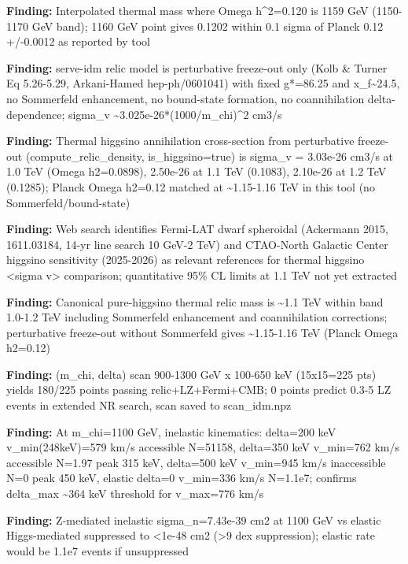 \documentclass[11pt,a4paper]{article}
\begin{document}
\textbf{Finding:} Interpolated thermal mass where Omega h\textasciicircum{}2=0.120 is 1159 GeV (1150-1170 GeV band); 1160 GeV point gives 0.1202 within 0.1 sigma of Planck 0.12 +/-0.0012 as reported by tool

\textbf{Finding:} serve-idm relic model is perturbative freeze-out only (Kolb \& Turner Eq 5.26-5.29, Arkani-Hamed hep-ph/0601041) with fixed g*=86.25 and x\_f\textasciitilde{}24.5, no Sommerfeld enhancement, no bound-state formation, no coannihilation delta-dependence; sigma\_v \textasciitilde{}3.025e-26*(1000/m\_chi)\textasciicircum{}2 cm3/s

\textbf{Finding:} Thermal higgsino annihilation cross-section from perturbative freeze-out (compute\_relic\_density, is\_higgsino=true) is sigma\_v = 3.03e-26 cm3/s at 1.0 TeV (Omega h2=0.0898), 2.50e-26 at 1.1 TeV (0.1083), 2.10e-26 at 1.2 TeV (0.1285); Planck Omega h2=0.12 matched at \textasciitilde{}1.15-1.16 TeV in this tool (no Sommerfeld/bound-state)

\textbf{Finding:} Web search identifies Fermi-LAT dwarf spheroidal (Ackermann 2015, 1611.03184, 14-yr line search 10 GeV-2 TeV) and CTAO-North Galactic Center higgsino sensitivity (2025-2026) as relevant references for thermal higgsino \textless{}sigma v\textgreater{} comparison; quantitative 95\% CL limits at 1.1 TeV not yet extracted

\textbf{Finding:} Canonical pure-higgsino thermal relic mass is \textasciitilde{}1.1 TeV within band 1.0-1.2 TeV including Sommerfeld enhancement and coannihilation corrections; perturbative freeze-out without Sommerfeld gives \textasciitilde{}1.15-1.16 TeV (Planck Omega h2=0.12)

\textbf{Finding:} (m\_chi, delta) scan 900-1300 GeV x 100-650 keV (15x15=225 pts) yields 180/225 points passing relic+LZ+Fermi+CMB; 0 points predict 0.3-5 LZ events in extended NR search, scan saved to scan\_idm.npz

\textbf{Finding:} At m\_chi=1100 GeV, inelastic kinematics: delta=200 keV v\_min(248keV)=579 km/s accessible N=51158, delta=350 keV v\_min=762 km/s accessible N=1.97 peak 315 keV, delta=500 keV v\_min=945 km/s inaccessible N=0 peak 450 keV, elastic delta=0 v\_min=336 km/s N=1.1e7; confirms delta\_max \textasciitilde{}364 keV threshold for v\_max=776 km/s

\textbf{Finding:} Z-mediated inelastic sigma\_n=7.43e-39 cm2 at 1100 GeV vs elastic Higgs-mediated suppressed to \textless{}1e-48 cm2 (\textgreater{}9 dex suppression); elastic rate would be 1.1e7 events if unsuppressed
\end{document}
